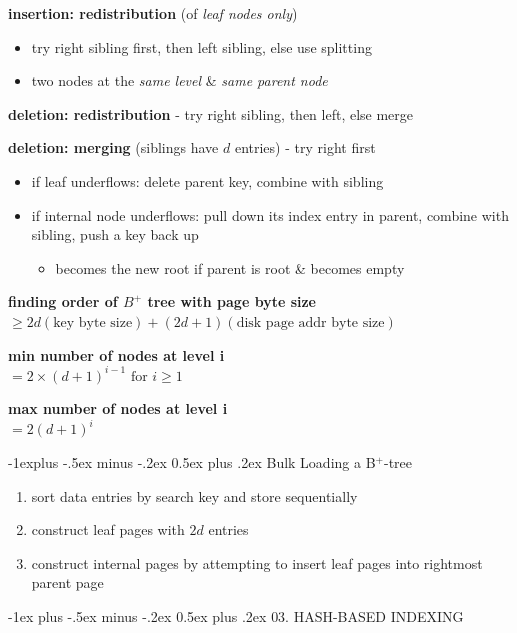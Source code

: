 \documentclass[10pt, landscape]{article}
\makeatletter
\renewcommand{\section}{\@startsection{section}{1}{0mm}%
  {-1ex plus -.5ex minus -.2ex}%
  {0.5ex plus .2ex}%
{\normalfont\large\bfseries}}
\renewcommand{\subsection}{\@startsection{subsection}{2}{0mm}%
  {-1explus -.5ex minus -.2ex}%
  {0.5ex plus .2ex}%
{\normalfont\normalsize\bfseries}}
\makeatother
\begin{document}
\begin{multicols*}{4}
  \textbf{insertion: redistribution} (of \textit{leaf nodes only})
  \begin{itemize}
    \item try right sibling first, then left sibling, else use splitting
    \item {} two nodes at the \textit{same level} \& \textit{same parent node}
  \end{itemize}

  \textbf{deletion: redistribution} - try right sibling, then left, else merge

  \textbf{deletion: merging} (siblings have $d$ entries) - try right first 
  \begin{itemize}
    \item if leaf underflows: delete parent key, combine with sibling
    \item if internal node underflows: pull down its index entry in parent, combine with sibling, push a key back up
      \begin{itemize}
        \item becomes the new root if parent is root \& becomes empty
      \end{itemize}
  \end{itemize}

  \textbf{finding order of $B^+$ tree with page byte size} \\$\geq 2d(\text{key byte size}) + (2d+1)(\text{disk page addr byte size})$

  \textbf{min number of nodes at level i} \\$= 2 \times (d+1)^{i-1} \text{ for } i \geq 1$

  \textbf{max number of nodes at level i} \\$= 2(d+1)^i$

  \subsection{Bulk Loading a B$^+$-tree}

  \begin{enumerate}
    \item sort data entries by search key and store sequentially
    \item construct leaf pages with $2d$ entries
    \item construct internal pages by attempting to insert leaf pages into rightmost parent page
  \end{enumerate}

  \section{03. HASH-BASED INDEXING}


\end{multicols*}
\end{document}
